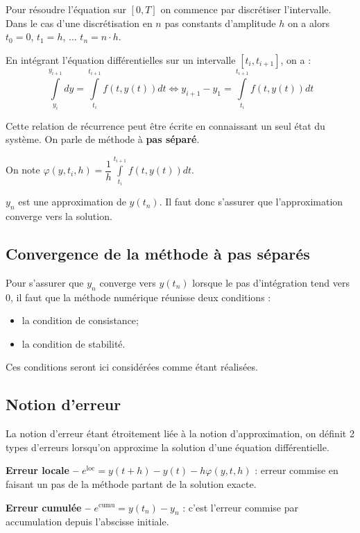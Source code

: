 \documentclass[10pt]{article}
\begin{document}
Pour résoudre l'équation sur $[0,T]$ on commence par discrétiser l'intervalle. Dans le cas d'une discrétisation en $n$ pas constants d'amplitude $h$ on a alors $t_0 = 0$, $t_1=h$, ... $t_n=n\cdot h$.

En intégrant l'équation différentielles sur un intervalle $[t_i, t_{i+1}]$, on a : 
$$
\int\limits_{y_i}^{y_{i+1}} dy = \int\limits_{t_i}^{t_{i+1}} f(t,y(t)) dt 
\Longleftrightarrow 
y_{i+1} - y_1 = \int\limits_{t_i}^{t_{i+1}} f(t,y(t)) dt 
$$

Cette relation de récurrence peut être écrite en connaissant un seul état du système. On parle de méthode à \textbf{pas séparé}.

On note $\varphi (y,t_i,h)= \dfrac{1}{h} \int\limits_{t_i}^{t_{i+1}} f(t,y(t)) dt $.

$y_n$ est une approximation de $y(t_n)$. Il faut donc s'assurer que l'approximation converge vers la solution. 

\subsection{Convergence de la méthode à pas séparés}

Pour s'assurer que $y_n$ converge vers $y(t_n)$ lorsque le pas d'intégration tend vers 0, il faut que la méthode numérique réunisse deux conditions :
\begin{itemize}
\item la condition de consistance;
\item la condition de stabilité. 
\end{itemize}

Ces conditions seront ici considérées comme étant réalisées.

\subsection{Notion d'erreur}

La notion d'erreur étant étroitement liée à la notion d'approximation, on définit 2 types d'erreurs lorsqu'on approxime la solution d'une équation différentielle.

\begin{defi}

\textbf{Erreur locale -- } $e^{\text{loc}}=y(t+h)-y(t)-h\varphi(y,t,h)$ : erreur commise en faisant un pas de la méthode partant de la solution exacte.

\textbf{Erreur cumulée -- } $e^{\text{cumu}} = y(t_n)-y_n$ : c'est l'erreur commise par accumulation depuis l'abscisse initiale.

\end{defi}
\end{document}
